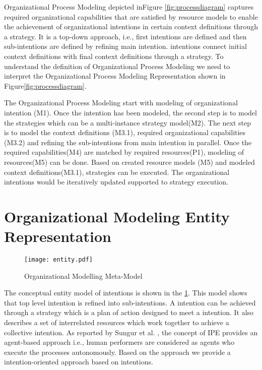 \hspace{4ex} Organizational Process Modeling depicted inFigure \ref{fig:processdiagram} captures required organizational capabilities that are satisfied by resource models  to enable the achievement of organizational intentions in certain context definitions through a strategy. It is a top-down approach, i.e., first intentions are defined and then sub-intentions  are defined by refining main intention. intentions connect initial context definitions with final context definitions through a strategy.  To understand the definition of Organizational Process Modeling we need to interpret the Organizational Process Modeling Representation shown in Figure\ref{fig:processdiagram}. 

\hspace{4ex} The Organizational Process Modeling start with modeling of organizational intention (M1). Once the intention has been modeled, the second step is to model the strategies which can be a multi-instance strategy model(M2). The next step is to model the context definitions (M3.1), required organizational capabilities (M3.2) and refining the sub-intentions from main intention in parallel. Once the required capabilities(M4) are matched by required resources(P1), modeling of resources(M5) can be done.  Based on created resource models (M5) and modeled context definitions(M3.1), strategies can be executed. The organizational intentions would be iteratively updated supported to strategy execution.  


\section{Organizational Modeling Entity Representation}
\label{sec:orgmodelrepresentation}

\begin{figure}
	\centering
	\texttt{[image: entity.pdf]}
	\caption{Organizational Modelling Meta-Model}
	\label{fig:metamodel}
\end{figure}

\hspace{4ex} The conceptual entity model of intentions is shown in the \ref{fig:metamodel}. This model shows that top level intention is refined into sub-intentions. A intention can be achieved through a strategy which is a plan of action designed to meet a intention. It also describes a set of interrelated resources which work together to achieve a collective intention. As reported by Sungur et al. \cite{Sungur2014a}, the concept of IPE provides an agent-based approach i.e., human performers are considered as agents who execute the processes autonomously. Based on the approach \cite{Sungur2014a} we provide a intention-oriented approach based on intentions.

